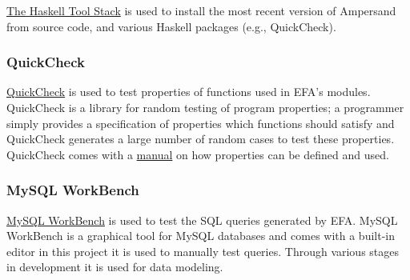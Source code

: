 \documentclass[journal,12pt,onecolumn,draftclsnofoot]{article}
\let\Oldsubsubsection\subsubsection
\renewcommand{\subsubsection}{\FloatBarrier\Oldsubsubsection}
\begin{document}
\href{https://www.haskell.org/cabal/}{The Haskell Tool Stack} is used to 
install the most recent version of Ampersand from source code, and various 
Haskell packages (e.g., QuickCheck).

\subsubsection*{QuickCheck}

\href{https://hackage.haskell.org/package/QuickCheck}{QuickCheck} is used to 
test properties of functions used in EFA's modules. QuickCheck is a library for 
random testing of program properties; a programmer simply provides a 
specification of properties which functions should satisfy
and QuickCheck generates a large number of random cases to test these properties.
QuickCheck comes with a
\href{http://www.cse.chalmers.se/~rjmh/QuickCheck/manual.html}{manual} on how 
properties can be defined and used. 

\subsubsection*{MySQL WorkBench}

\href{https://dev.mysql.com/doc/workbench/en/}{MySQL WorkBench} is used to test 
the SQL queries generated by EFA. MySQL WorkBench is a graphical tool for MySQL 
databases and comes with a built-in editor in this project it is used to 
manually test queries. Through various stages in development it is used for 
data modeling.
\end{document}

